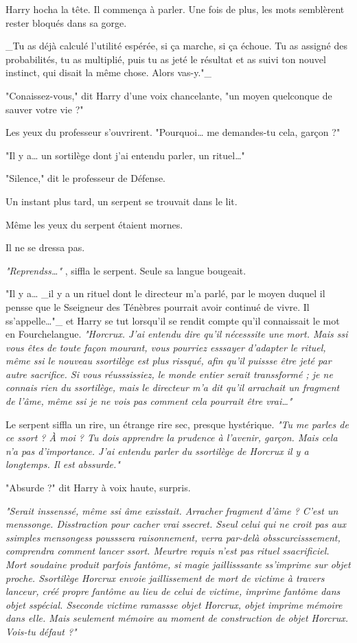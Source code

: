 Harry hocha la tête. Il commença à parler. Une fois de plus, les mots semblèrent rester bloqués dans sa gorge.

\_Tu as déjà calculé l'utilité espérée, si ça marche, si ça échoue. Tu as assigné des probabilités, tu as multiplié, puis tu as jeté le résultat et as suivi ton nouvel instinct, qui disait la même chose. Alors vas-y."\_

"Conaissez-vous," dit Harry d'une voix chancelante, "un moyen quelconque de sauver votre vie ?"

Les yeux du professeur s'ouvrirent. "Pourquoi… me demandes-tu cela, garçon ?"

"Il y a… un sortilège dont j'ai entendu parler, un rituel…"

"Silence," dit le professeur de Défense.

Un instant plus tard, un serpent se trouvait dans le lit.

Même les yeux du serpent étaient mornes.

Il ne se dressa pas.

\emph{"Reprendss…"} , siffla le serpent. Seule sa langue bougeait.

"Il y a… \_il y a un rituel dont le directeur m'a parlé, par le moyen duquel il pensse que le Sseigneur des Ténèbres pourrait avoir continué de vivre. Il ss'appelle…"\_ et Harry se tut lorsqu'il se rendit compte qu'il connaissait le mot en Fourchelangue. \emph{"Horcrux. J'ai entendu dire qu'il nécesssite une mort. Mais ssi vous êtes de toute façon mourant, vous pourriez esssayer d'adapter le rituel, même ssi le nouveau ssortilège est plus rissqué, afin qu'il puissse être jeté par autre sacrifice. Si vous réusssissiez, le monde entier serait transsformé ; je ne connais rien du ssortilège, mais le directeur m'a dit qu'il arrachait un fragment de l'âme, même ssi je ne vois pas comment cela pourrait être vrai…"} 

Le serpent siffla un rire, un étrange rire sec, presque hystérique. \emph{"Tu me parles de ce ssort ? À moi ? Tu dois apprendre la prudence à l'avenir, garçon. Mais cela n'a pas d'importance. J'ai entendu parler du ssortilège de Horcrux il y a longtemps. Il est abssurde."} 

"Absurde ?" dit Harry à voix haute, surpris.

\emph{"Serait inssenssé, même ssi âme exisstait. Arracher fragment d'âme ? C'est un menssonge. Disstraction pour cacher vrai ssecret. Sseul celui qui ne croit pas aux ssimples mensongess pousssera raisonnement, verra par-delà obsscurcisssement, comprendra comment lancer ssort. Meurtre requis n'est pas rituel ssacrificiel. Mort soudaine produit parfois fantôme, si magie jaillisssante ss'imprime sur objet proche. Ssortilège Horcrux envoie jaillissement de mort de victime à travers lanceur, créé propre fantôme au lieu de celui de victime, imprime fantôme dans objet sspécial. Sseconde victime ramassse objet Horcrux, objet imprime mémoire dans elle. Mais seulement mémoire au moment de construction de objet Horcrux. Vois-tu défaut ?"} 

